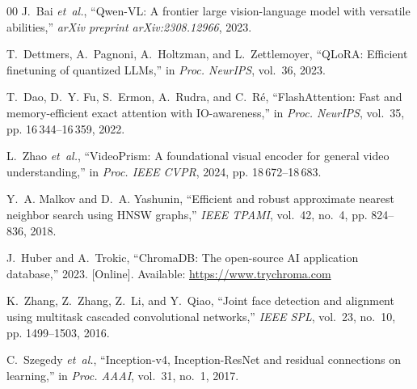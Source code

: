 \documentclass[10pt, conference]{IEEEtran}
\begin{document}
{\begin{thebibliography}{00}
J.~Bai \emph{et~al.}, ``Qwen-VL: A frontier large vision-language model with versatile abilities,'' \emph{arXiv preprint arXiv:2308.12966}, 2023.

T.~Dettmers, A.~Pagnoni, A.~Holtzman, and L.~Zettlemoyer, ``QLoRA: Efficient finetuning of quantized LLMs,'' in \emph{Proc. NeurIPS}, vol.~36, 2023.

T.~Dao, D.~Y. Fu, S.~Ermon, A.~Rudra, and C.~R{\'e}, ``FlashAttention: Fast and memory-efficient exact attention with IO-awareness,'' in \emph{Proc. NeurIPS}, vol.~35, pp. 16\,344--16\,359, 2022.

L.~Zhao \emph{et~al.}, ``VideoPrism: A foundational visual encoder for general video understanding,'' in \emph{Proc. IEEE CVPR}, 2024, pp. 18\,672--18\,683.

Y.~A. Malkov and D.~A. Yashunin, ``Efficient and robust approximate nearest neighbor search using HNSW graphs,'' \emph{IEEE TPAMI}, vol.~42, no.~4, pp. 824--836, 2018.

J.~Huber and A.~Trokic, ``ChromaDB: The open-source AI application database,'' 2023. [Online]. Available: \url{https://www.trychroma.com}

K.~Zhang, Z.~Zhang, Z.~Li, and Y.~Qiao, ``Joint face detection and alignment using multitask cascaded convolutional networks,'' \emph{IEEE SPL}, vol.~23, no.~10, pp. 1499--1503, 2016.

C.~Szegedy \emph{et~al.}, ``Inception-v4, Inception-ResNet and residual connections on learning,'' in \emph{Proc. AAAI}, vol.~31, no.~1, 2017.

\end{thebibliography}
}
\end{document}
